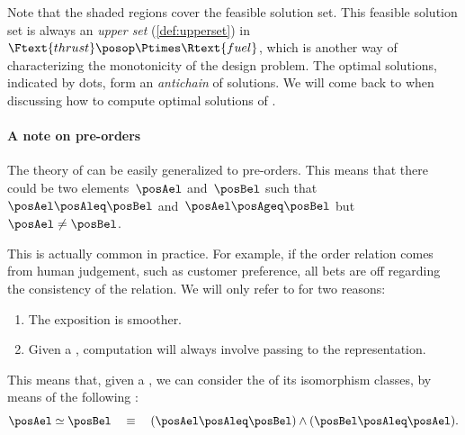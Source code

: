 \begin{example}
        Note that the shaded regions cover the feasible solution set.
        This feasible solution set is always an \emph{upper set} (\cref{def:upperset}) in~$\Ftext{thrust}\posop \Ptimes \Rtext{fuel}$, which is another way of characterizing the monotonicity of the design problem.
        The optimal solutions, indicated by dots, form an \emph{antichain} of solutions.
        We will come back to  when discussing how to compute optimal solutions of .

    \end{example}


    \paragraph{A note on pre-orders}
    The theory of  can be easily generalized to pre-orders.
    This means that there could be two elements~$\posAel$ and~$\posBel$ such that~$\posAel\posAleq \posBel$ and~$\posAel \posAgeq \posBel$ but~$\posAel \neq \posBel$.

    This is actually common in practice.
    For example, if the order relation comes from human judgement, such as customer preference, all bets are off regarding the consistency of the relation.
    We will only refer to  for two reasons:
    \begin{enumerate}
        \item The exposition is smoother.
        \item Given a , computation will always involve passing to the  representation.
    \end{enumerate}
    This means that, given a , we can consider the  of its isomorphism classes, by means of the following :
    \begin{equation}
        \posAel \simeq \posBel \quad \equiv \quad (\posAel \posAleq \posBel) \wedge (\posBel \posAleq \posAel).
    \end{equation}


